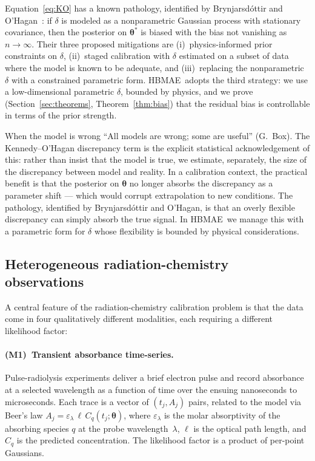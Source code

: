 \documentclass[12pt]{article}
\theoremstyle{plain}
\theoremstyle{definition}
\theoremstyle{remark}
\newcommand{\HBMAE}{HBMAE\xspace}
\begin{document}
Equation~\eqref{eq:KO} has a known pathology, identified by Brynjarsd\'ottir
and O'Hagan~\citep{Brynjarsdottir2014}:  if $\delta$ is modeled as a
nonparametric Gaussian process with stationary covariance, then the
posterior on $\boldsymbol{\theta}^*$ is biased with the bias not vanishing
as $n\to\infty$.  Their three proposed mitigations are (i)~physics-informed
prior constraints on $\delta$, (ii)~staged calibration with $\delta$
estimated on a subset of data where the model is known to be adequate, and
(iii)~replacing the nonparametric $\delta$ with a constrained parametric
form.  \HBMAE\ adopts the third strategy:  we use a low-dimensional
parametric $\delta$, bounded by physics, and we prove
(Section~\ref{sec:theorems}, Theorem~\ref{thm:bias}) that the residual bias
is controllable in terms of the prior strength.

\begin{tutorialbox}{When the model is wrong}
``All models are wrong; some are useful'' (G.~Box).  The Kennedy--O'Hagan
discrepancy term is the explicit statistical acknowledgement of this:
rather than insist that the model is true, we estimate, separately, the
size of the discrepancy between model and reality.  In a calibration
context, the practical benefit is that the posterior on
$\boldsymbol{\theta}$ no longer absorbs the discrepancy as a parameter
shift — which would corrupt extrapolation to new conditions.  The
pathology, identified by Brynjarsd\'ottir and O'Hagan, is that an overly
flexible discrepancy can simply absorb the true signal.  In \HBMAE\ we
manage this with a parametric form for $\delta$ whose flexibility is
bounded by physical considerations.
\end{tutorialbox}

\subsection{Heterogeneous radiation-chemistry observations}\label{sec:bg:modalities}

A central feature of the radiation-chemistry calibration problem is that
the data come in four qualitatively different modalities, each requiring a
different likelihood factor:

\paragraph{(M1)~Transient absorbance time-series.}  Pulse-radiolysis
experiments deliver a brief electron pulse and record absorbance at a
selected wavelength as a function of time over the ensuing nanoseconds to
microseconds.  Each trace is a vector of $(t_j, A_j)$ pairs, related to the
model via Beer's law $A_j = \varepsilon_\lambda\,\ell\,C_q(t_j;
\boldsymbol{\theta})$, where $\varepsilon_\lambda$ is the molar absorptivity
of the absorbing species $q$ at the probe wavelength~$\lambda$, $\ell$ is
the optical path length, and $C_q$ is the predicted concentration.  The
likelihood factor is a product of per-point Gaussians.
\end{document}
